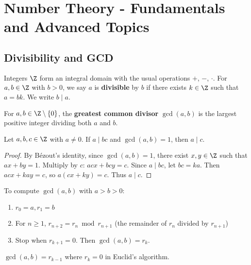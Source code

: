 \chapter{Number Theory - Fundamentals and Advanced Topics}
\label{ch:number-theory}

\section{Divisibility and GCD}
\label{sec:divisibility-gcd}

Integers $\Z$ form an integral domain with the usual operations $+$, $-$, $\cdot$. For $a, b \in \Z$ with $b > 0$, we say $a$ is \textbf{divisible} by $b$ if there exists $k \in \Z$ such that $a = bk$. We write $b \mid a$.

\begin{definition}
\label{def:gcd}
For $a, b \in \Z \setminus \{0\}$, the \textbf{greatest common divisor} $\gcd(a, b)$ is the largest positive integer dividing both $a$ and $b$.
\end{definition}

\begin{theorem}
\label{thm:euclid-lemma}
Let $a, b, c \in \Z$ with $a \neq 0$. If $a \mid bc$ and $\gcd(a, b) = 1$, then $a \mid c$.
\end{theorem}

\begin{proof}
By Bézout's identity, since $\gcd(a, b) = 1$, there exist $x, y \in \Z$ such that $ax + by = 1$. Multiply by $c$: $acx + bc y = c$. Since $a \mid bc$, let $bc = ka$. Then $acx + ka y = c$, so $a(cx + ky) = c$. Thus $a \mid c$.
\end{proof}

\begin{definition}
\label{def:euclid-algorithm}
To compute $\gcd(a, b)$ with $a > b > 0$:
\begin{enumerate}
\item $r_0 = a, r_1 = b$
\item For $n \geq 1$, $r_{n+2} = r_n \bmod r_{n+1}$ (the remainder of $r_n$ divided by $r_{n+1}$)
\item Stop when $r_{k+1} = 0$. Then $\gcd(a, b) = r_k$.
\end{enumerate}
\end{definition}

\begin{theorem}
\label{thm:euclid-lemma-gcd}
$\gcd(a, b) = r_{k-1}$ where $r_k = 0$ in Euclid's algorithm.
\end{theorem}

